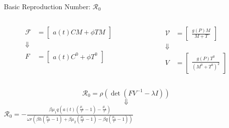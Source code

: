 \documentclass{beamer}
\begin{document}
\begin{frame}{Basic Reproduction Number: $\mathscr{R}_{0}$}
    \begin{columns}
        \begin{column}{0.5\textwidth}
            \begin{align*}
                \mathscr{F} &= \begin{bmatrix} a(t)CM+\phi TM \end{bmatrix}\\
                \Downarrow\\
                F &= \begin{bmatrix} a(t)C^{0} + \phi T^{0} \end{bmatrix}
            \end{align*}
        \end{column}
        \begin{column}{0.5\textwidth}
            \begin{align*}
                \mathscr{V} &= \begin{bmatrix} \frac{g(P)M}{M+T} \end{bmatrix}\\
                \Downarrow\\
                V &= \begin{bmatrix} \frac{g(P)T^{0}}{(M^{0}+T^{0})^{2}} \end{bmatrix}
            \end{align*}
        \end{column}
    \end{columns}
    $$\mathscr{R}_{0} = \rho(\det(FV^{-1} - \lambda I))$$
    $$\Downarrow$$
    \centering
    $\displaystyle {\mathscr{R}}_{0} = - \frac{\beta \mu_{1}q(a(t)(\frac{\mu_{1}}{r}-1)-\frac{\mu_{1}}{r})}{\omega r (\beta h (\frac{\mu_{1}}{r}-1) + \beta \mu_{2} (\frac{\mu_{1}}{r}-1) - \beta q(\frac{\mu_{1}}{r}-1))}$
\end{frame}
\end{document}
